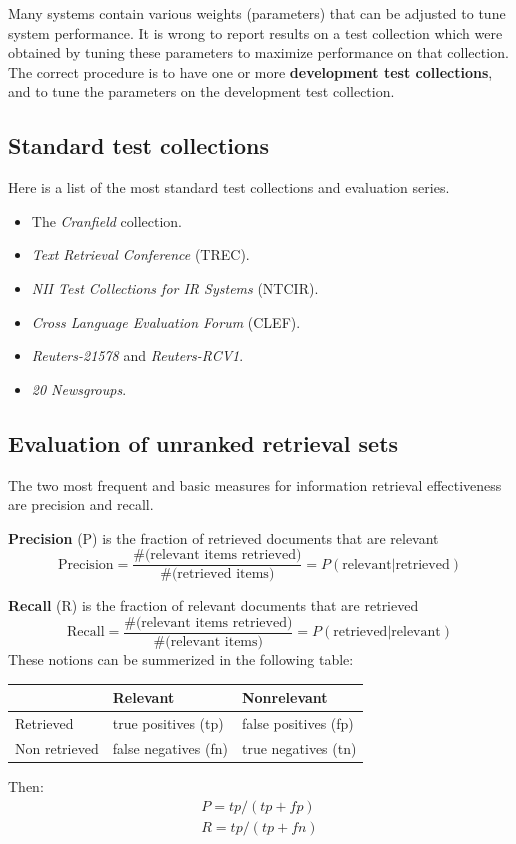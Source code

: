 \documentclass[letterpaper,11pt]{article}
\begin{document}
Many systems contain various weights (parameters) that can be adjusted to tune system performance. It is wrong to report results on a test collection which were obtained by tuning these parameters to maximize performance on that collection. The correct procedure is to have one or more \textbf{development test collections}, and to tune the parameters on the development test collection.

\subsection{Standard test collections}
Here is a list of the most standard test collections and evaluation series.
\begin{itemize}
    \item The \textit{Cranfield} collection.
    \item \textit{Text Retrieval Conference} (TREC).
    \item \textit{NII Test Collections for IR Systems} (NTCIR).
    \item \textit{Cross Language Evaluation Forum} (CLEF).
    \item \textit{Reuters-21578} and \textit{Reuters-RCV1}.
    \item \textit{20 Newsgroups}.
\end{itemize}

\subsection{Evaluation of unranked retrieval sets}
The two most frequent and basic measures for information retrieval effectiveness are precision and recall.

\textbf{Precision} (P) is the fraction of retrieved documents that are relevant
\[
\textrm{Precision} = \frac{\textrm{\#(relevant items retrieved)}}{\textrm{\#(retrieved items)}} = P(\textrm{relevant|retrieved})
\]

\textbf{Recall} (R) is the fraction of relevant documents that are retrieved
\[
\textrm{Recall} = \frac{\textrm{\#(relevant items retrieved)}}{\textrm{\#(relevant items)}} = P(\textrm{retrieved|relevant})
\]
These notions can be summerized in the following table:
\begin{table}[H]
\centering
\begin{tabular}{|l|l|l|}
\hline
              & Relevant             & Nonrelevant          \\ \hline
Retrieved     & true positives (tp)  & false positives (fp) \\ \hline
Non retrieved & false negatives (fn) & true negatives (tn)  \\ \hline
\end{tabular}
\end{table}
Then:
\begin{equation}
\begin{split}
    P = tp / (tp + fp) \\
    R = tp / (tp + fn)    
\end{split}
\end{equation}
\end{document}
